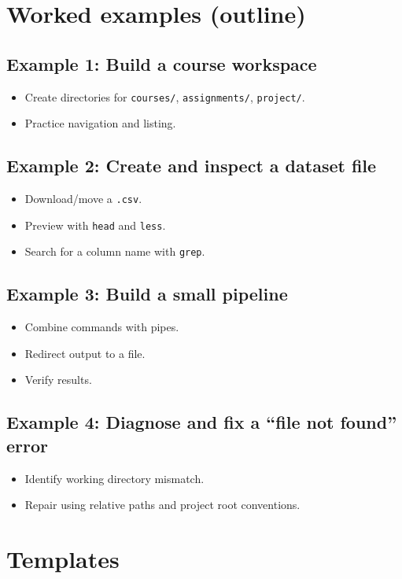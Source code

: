 \section{Worked examples (outline)}
\subsection{Example 1: Build a course workspace}
\begin{itemize}
\item Create directories for \texttt{courses/}, \texttt{assignments/}, \texttt{project/}.
\item Practice navigation and listing.
\end{itemize}

\subsection{Example 2: Create and inspect a dataset file}
\begin{itemize}
\item Download/move a \texttt{.csv}.
\item Preview with \texttt{head} and \texttt{less}.
\item Search for a column name with \texttt{grep}.
\end{itemize}

\subsection{Example 3: Build a small pipeline}
\begin{itemize}
\item Combine commands with pipes.
\item Redirect output to a file.
\item Verify results.
\end{itemize}

\subsection{Example 4: Diagnose and fix a ``file not found'' error}
\begin{itemize}
\item Identify working directory mismatch.
\item Repair using relative paths and project root conventions.
\end{itemize}

\section{Templates}
